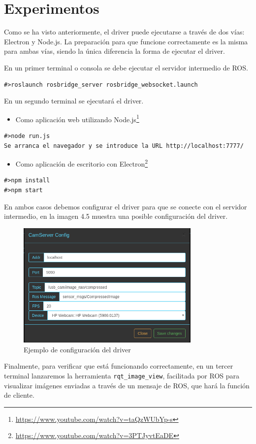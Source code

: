 \section{Experimentos}
Como se ha visto anteriormente, el driver puede ejecutarse a través de dos vías: Electron y Node.js. La preparación para que funcione correctamente es la misma para ambas vías, siendo la única diferencia la forma de ejecutar el driver.

En un primer terminal o consola se debe ejecutar el servidor intermedio de ROS.

\begin{lstlisting}[caption= Ejecución del servidor intermedio, label=cod.servidorintermedio]
#>roslaunch rosbridge_server rosbridge_websocket.launch
\end{lstlisting}
En un segundo terminal se ejecutará el driver.
\begin{itemize}
\item 
Como aplicación web utilizando Node.js\footnote{\url{https://www.youtube.com/watch?v=taQzWUbYp-s}}
\end{itemize}
\begin{lstlisting}[caption= Ejecución con Node.js, label=cod.nodejs]
#>node run.js
Se arranca el navegador y se introduce la URL http://localhost:7777/
\end{lstlisting}
\begin{itemize}
\item 
Como aplicación de escritorio con Electron\footnote{\url{https://www.youtube.com/watch?v=3PTJyvtEaDE}}
\end{itemize}
\begin{lstlisting}[caption= Ejecución con Electron, label=cod.electron]
#>npm install
#>npm start
\end{lstlisting}
En ambos casos debemos configurar el driver para que se conecte con el servidor intermedio, en la imagen 4.5 muestra una posible configuración del driver.
\begin{figure}[H]
  \begin{center}
    \includegraphics[width=0.8\textwidth]{figures/configcamservertest.png}
		\caption{Ejemplo de configuración del driver}
		\label{fig.esquemacamserver}
		\end{center}
\end{figure}
Finalmente, para verificar que está funcionando correctamente, en un tercer terminal lanzaremos la herramienta \texttt{rqt\_image\_view}, facilitada por ROS para visualizar imágenes enviadas a través de un mensaje de ROS, que hará la función de cliente.

